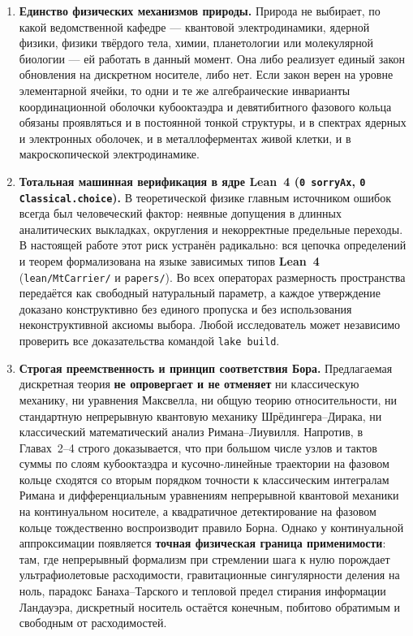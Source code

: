 \begin{enumerate}[leftmargin=*]
\item \textbf{Единство физических механизмов природы.}
  Природа не выбирает, по какой ведомственной кафедре --- квантовой электродинамики, ядерной физики, физики твёрдого тела, химии, планетологии или молекулярной биологии --- ей работать в данный момент. Она либо реализует единый закон обновления на дискретном носителе, либо нет. Если закон верен на уровне элементарной ячейки, то одни и те же алгебраические инварианты координационной оболочки кубооктаэдра и девятибитного фазового кольца обязаны проявляться и в постоянной тонкой структуры, и в спектрах ядерных и электронных оболочек, и в металлоферментах живой клетки, и в макроскопической электродинамике.

\item \textbf{Тотальная машинная верификация в ядре Lean~4 (\texttt{0 sorryAx}, \texttt{0 Classical.choice}).}
  В теоретической физике главным источником ошибок всегда был человеческий фактор: неявные допущения в длинных аналитических выкладках, округления и некорректные предельные переходы. В настоящей работе этот риск устранён радикально: вся цепочка определений и теорем формализована на языке зависимых типов \textbf{Lean~4} (\texttt{lean/MtCarrier/} и \texttt{papers/}). Во всех операторах размерность пространства передаётся как свободный натуральный параметр, а каждое утверждение доказано конструктивно без единого пропуска и без использования неконструктивной аксиомы выбора. Любой исследователь может независимо проверить все доказательства командой \texttt{lake build}.

\item \textbf{Строгая преемственность и принцип соответствия Бора.}
  Предлагаемая дискретная теория \textbf{не опровергает и не отменяет} ни классическую механику, ни уравнения Максвелла, ни общую теорию относительности, ни стандартную непрерывную квантовую механику Шрёдингера--Дирака, ни классический математический анализ Римана--Лиувилля. Напротив, в Главах~2--4 строго доказывается, что при большом числе узлов и тактов суммы по слоям кубооктаэдра и кусочно-линейные траектории на фазовом кольце сходятся со вторым порядком точности к классическим интегралам Римана и дифференциальным уравнениям непрерывной квантовой механики на континуальном носителе, а квадратичное детектирование на фазовом кольце тождественно воспроизводит правило Борна.
  Однако у континуальной аппроксимации появляется \textbf{точная физическая граница применимости}: там, где непрерывный формализм при стремлении шага к нулю порождает ультрафиолетовые расходимости, гравитационные сингулярности деления на ноль, парадокс Банаха--Тарского и тепловой предел стирания информации Ландауэра, дискретный носитель остаётся конечным, побитово обратимым и свободным от расходимостей.


\end{enumerate}
